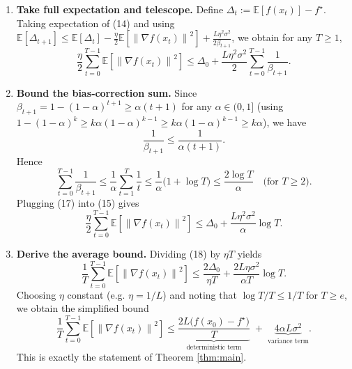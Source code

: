 \documentclass[11pt]{article}
\newcommand{\EE}{\mathbb{E}}
\newcommand{\norm}[1]{\left\|#1\right\|}
\newcommand{\grad}{\nabla}
\begin{document}
\begin{enumerate}[leftmargin=*,label=[Step \arabic*]]
\[    \le f(x_{t})
       -\Bigl(\eta_{t}-\frac{\eta}{2}\Bigr)\norm{\grad f(x_{t})}^{2}
       +\frac{L\eta^{2}\sigma^{2}}{2\beta_{t+1}} .
    \tag{13}
    \]
    Since $\eta_{t}\ge 0$, we can drop the non‑negative term
    $\bigl(\eta_{t}-\frac{\eta}{2}\bigr)_{+}\ge 0$ and keep only a conservative bound:
    \[
    \EE\!\left[f(x_{t+1})\mid\mathcal{F}_{t}\right]
    \le f(x_{t})
       -\frac{\eta}{2}\norm{\grad f(x_{t})}^{2}
       +\frac{L\eta^{2}\sigma^{2}}{2\beta_{t+1}} .
    \tag{14}
    \]
\item \textbf{Take full expectation and telescope.}
    Define $\Delta_{t}:=\EE[f(x_{t})]-f^{\star}$.  Taking expectation of (14) and
    using $\EE[\Delta_{t+1}]\le\EE[\Delta_{t}]
          -\frac{\eta}{2}\EE[\norm{\grad f(x_{t})}^{2}]
          +\frac{L\eta^{2}\sigma^{2}}{2\beta_{t+1}}$,
    we obtain for any $T\ge1$,
    \[
    \frac{\eta}{2}\sum_{t=0}^{T-1}\EE\!\left[\norm{\grad f(x_{t})}^{2}\right]
    \le \Delta_{0}
       +\frac{L\eta^{2}\sigma^{2}}{2}
         \sum_{t=0}^{T-1}\frac{1}{\beta_{t+1}} .
    \tag{15}
    \]
\item \textbf{Bound the bias‑correction sum.}
    Since $\beta_{t+1}=1-(1-\alpha)^{t+1}\ge \alpha(t+1)$ for any $\alpha\in(0,1]$
    (using $1-(1-\alpha)^{k}\ge k\alpha(1-\alpha)^{k-1}\ge k\alpha(1-\alpha)^{k-1}\ge k\alpha$),
    we have
    \[
    \frac{1}{\beta_{t+1}}\le \frac{1}{\alpha(t+1)} .
    \tag{16}
    \]
    Hence
    \[
    \sum_{t=0}^{T-1}\frac{1}{\beta_{t+1}}
    \le\frac{1}{\alpha}\sum_{t=1}^{T}\frac{1}{t}
    \le\frac{1}{\alpha}\bigl(1+\log T\bigr)
    \le\frac{2\log T}{\alpha}   \quad\text{(for $T\ge 2$)} .
    \tag{17}
    \]
    Plugging (17) into (15) gives
    \[
    \frac{\eta}{2}\sum_{t=0}^{T-1}\EE\!\left[\norm{\grad f(x_{t})}^{2}\right]
    \le \Delta_{0}
       +\frac{L\eta^{2}\sigma^{2}}{\alpha}\log T .
    \tag{18}
    \]
\item \textbf{Derive the average bound.}
    Dividing (18) by $\eta T$ yields
    \[
    \frac{1}{T}\sum_{t=0}^{T-1}
    \EE\!\left[\norm{\grad f(x_{t})}^{2}\right]
    \le
    \frac{2\Delta_{0}}{\eta T}
    +\frac{2L\eta\sigma^{2}}{\alpha T}\log T .
    \tag{19}
    \]
    Choosing $\eta$ constant (e.g. $\eta=1/L$) and noting that $\log T/T\le 1/T$ for
    $T\ge e$, we obtain the simplified bound
    \[
    \frac{1}{T}\sum_{t=0}^{T-1}
    \EE\!\left[\norm{\grad f(x_{t})}^{2}\right]
    \le
    \underbrace{\frac{2L\bigl(f(x_{0})-f^{\star}\bigr)}{T}}_{\displaystyle\text{deterministic term}}
    \;+\;
    \underbrace{4\alpha L\sigma^{2}}_{\displaystyle\text{variance term}} .
    \tag{20}
    \]
    This is exactly the statement of Theorem \ref{thm:main}.
\end{enumerate}
\end{document}

